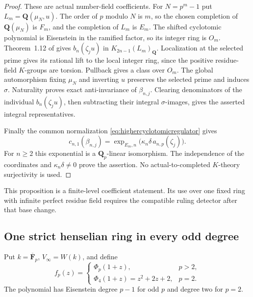 \documentclass[11pt,a4paper]{article}
\theoremstyle{remark}
\newcommand{\Q}{\mathbf Q}
\newcommand{\F}{\mathbf F}
\begin{document}
\begin{proof}
These are actual number-field coefficients. For $N=p^m-1$ put
$L_m=\Q(\mu_N,u)$.
The order of $p$ modulo $N$ is $m$, so the chosen completion
of $\Q(\mu_N)$ is $F_m$, and the completion of $L_m$ is $E_m$.
The shifted cyclotomic polynomial is Eisenstein in the ramified
factor, so its integer ring is $O_m$.
Theorem~1.12 of \cite{BesserDeJeu} gives $b_n(\zeta_ju)$ in
$K_{2n-1}(L_m)_{\Q}$.
Localization at the selected prime gives its rational lift to the
local integer ring, since the positive residue-field $K$-groups
are torsion. Pullback gives a class over $O_m$.
The global automorphism fixing $\mu_N$ and inverting $u$ preserves
the selected prime and induces $\sigma$.
Naturality proves exact anti-invariance of $\beta_{n,j}$.
Clearing denominators of the individual $b_n(\zeta_ju)$, then
subtracting their integral $\sigma$-images, gives the asserted
integral representatives.

Finally the common normalization
\eqref{eq:highercyclotomicregulator} gives
\[
 c_{n,1}(\beta_{n,j})
 =\exp_{E_m,n}\bigl(\kappa_n\delta\,a_{n,p}(\zeta_j)\bigr).
\]
For $n\geq2$ this exponential is a $\Q_p$-linear isomorphism.
The independence of the coordinates and $\kappa_n\delta\ne0$
prove the assertion. No actual-to-completed $K$-theory
surjectivity is used.
\end{proof}

This proposition is a finite-level coefficient statement.
Its use over one fixed ring with infinite perfect residue field
requires the compatible ruling detector after that base change.


\subsection{One strict henselian ring in every odd degree}
\label{sec:strictallprimeallodd}

Put $k=\overline{\F}_p$, $V_\infty=W(k)$, and define
\[
 f_p(z)=
 \begin{cases}
  \Phi_p(1+z),&p>2,\\
  \Phi_4(1+z)=z^2+2z+2,&p=2.
 \end{cases}
\]
The polynomial has Eisenstein degree $p-1$ for odd $p$ and degree
two for $p=2$.
\end{document}
